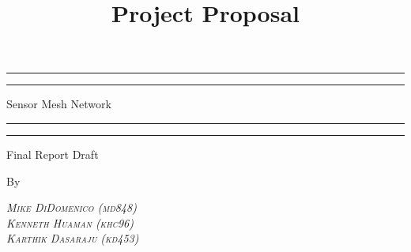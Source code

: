 \documentclass[11pt, a4paper]{article}
\title{Project Proposal}
\author{}
\date{}
\begin{document}
	
\begin{titlepage} %
	
	\centering %
	
	\scshape %
	
	\vspace*{\baselineskip} %
	
	
	\rule{\textwidth}{1.6pt}\vspace*{-\baselineskip}\vspace*{2pt} %
	\rule{\textwidth}{0.4pt} %
	
	\vspace{0.75\baselineskip} %
	
	{\LARGE Sensor Mesh Network\\} %
	
	\vspace{0.75\baselineskip} %
	
	\rule{\textwidth}{0.4pt}\vspace*{-\baselineskip}\vspace{3.2pt} %
	\rule{\textwidth}{1.6pt} %
	
	\vspace{2\baselineskip} %
	
	
	Final Report Draft
	
	
	\vspace*{14\baselineskip} %
	
	
	By
	
	\vspace{0.5\baselineskip} %
	
	{\scshape\Large \textit{Mike DiDomenico (md848)}  \\} %
	{\scshape\Large \textit{Kenneth Huaman (khc96)} \\} %
	{\scshape\Large \textit{Karthik Dasaraju (kd453)} \\} %
	

\end{titlepage}
\end{document}
